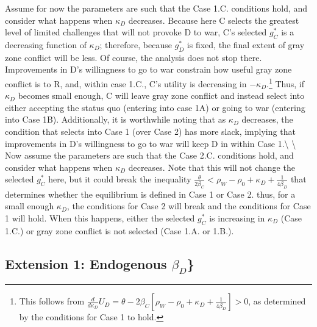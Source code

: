 \documentclass[
]{article}
\begin{document}
Assume for now the parameters are such that the Case 1.C. conditions
hold, and consider what happens when \(\kappa_{D}\) decreases. Because
here C selects the greatest level of limited challenges that will not
provoke D to war, C's selected \(g_{C}^{*}\) is a decreasing function of
\(\kappa_{D}\); therefore, because \(g_{D}^{*}\) is fixed, the final
extent of gray zone conflict will be less. Of course, the analysis does
not stop there. Improvements in D's willingness to go to war constrain
how useful gray zone conflict is to R, and, within case 1.C., C's
utility is decreasing in
\(-\kappa_{D}\).\footnote{This follows from $\frac{d}{d\kappa_{D}}U_{D}=\theta-2\beta_{C}\left[\rho_{W}-\rho_{0}+\kappa_{D}+\frac{1}{4\beta_{D}}\right]>0$, as determined by the conditions for Case 1 to hold.}
Thus, if \(\kappa_{D}\) becomes small enough, C will leave gray zone
conflict and instead select into either accepting the status quo
(entering into case 1A) or going to war (entering into Case 1B).
Additionally, it is worthwhile noting that as \(\kappa_{D}\) decreases,
the condition that selects into Case 1 (over Case 2) has more slack,
implying that improvements in D's willingness to go to war will keep D
in within Case 1.\textbackslash{} \textbackslash{} Now assume the
parameters are such that the Case 2.C. conditions hold, and consider
what happens when \(\kappa_{D}\) decreases. Note that this will not
change the selected \(g_{C}^{*}\) here, but it could break the
inequality
\(\frac{\theta}{2\beta_{C}}<\rho_{W}-\rho_{0}+\kappa_{D}+\frac{1}{4\beta_{D}}\)
that determines whether the equilibrium is defined in Case 1 or Case 2.
thus, for a small enough \(\kappa_{D}\), the conditions for Case 2 will
break and the conditions for Case 1 will hold. When this happens, either
the selected \(g_{C}^{*}\) is increasing in \(\kappa_{D}\) (Case 1.C.)
or gray zone conflict is not selected (Case 1.A. or 1.B.).

\hypertarget{extension-1-endogenous-beta_d}{%
\subsection{\texorpdfstring{Extension 1: Endogenous
\(\beta_{D}\)\}}{Extension 1: Endogenous \textbackslash beta\_\{D\}\}}}\label{extension-1-endogenous-beta_d}}
\end{document}
